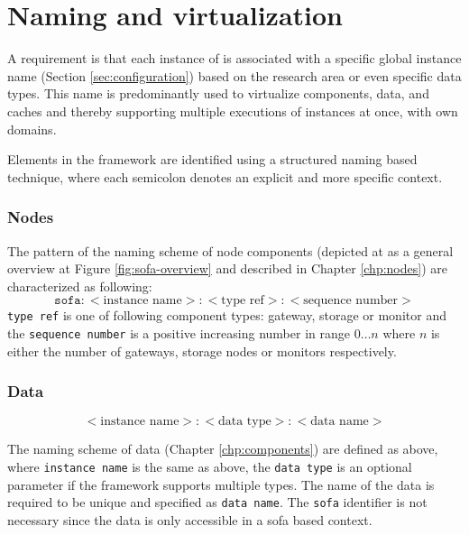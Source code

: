 \section{Naming and virtualization} \label{sec:virtualization}
A requirement is that each instance of \CodeNameFull is associated with a specific global instance name (Section \ref{sec:configuration}) \eg based on the research area or even specific data types. This name is predominantly used to virtualize components, data, and caches and thereby supporting multiple executions of \CodeName instances at once, with own domains.
\newline

Elements in the framework are identified using a structured naming based technique\cite{Tanenbaum:2006:DSP:1202502}, where each semicolon denotes an explicit and more specific context. 

\subsubsection*{Nodes}
The pattern of the naming scheme of node components (depicted at as a general overview at Figure \ref{fig:sofa-overview} and described in Chapter \ref{chp:nodes}) are characterized as following:
\begin{equation*}
	\texttt{sofa}:<\text{instance name}>:<\text{type ref}>:<\text{sequence number}>
\end{equation*}
\texttt{type ref} is one of following component types: gateway, storage or monitor and the \texttt{sequence number} is a positive increasing number in range $0\ldots n$ where $n$ is either the number of gateways, storage nodes or monitors respectively.

\subsubsection*{Data}
\begin{equation*}
	<\text{instance name}>:<\text{data type}>:<\text{data name}>
\end{equation*}

The naming scheme of data (Chapter \ref{chp:components}) are defined as above, where \texttt{instance name} is the same as above, the \texttt{data type} is an optional parameter if the framework supports multiple types. The name of the data is required to be unique and specified as \texttt{data name}. The \texttt{sofa} identifier is not necessary since the data is only accessible in a sofa based context.

